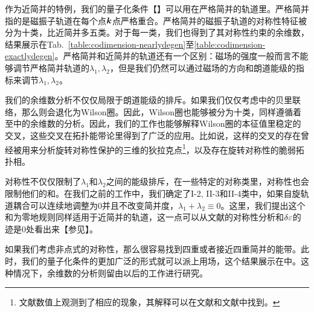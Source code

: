 作为近简并的特例，我们的量子化条件【】可以用在严格简并的轨道里。严格简并指的是磁振子轨道在每个点$\boldsymbol{k}$点严格重合。严格简并的磁振子轨道的对称性特征被分为十类，比近简并多五类。对于每一类，我们也得到了其对称性约束的余维数，结果展示在Tab.\ \ref{table:codimension-nearlydegen}至\ref{table:codimension-exactlydegen}。严格简并和近简并的轨道还有一个区别：磁场的强度一般而言不能够调节严格简并轨道的$\lambda_1,\lambda_2$，但是我们仍然可以通过磁场的方向和朗道能级的指标来调节$\lambda_1,\lambda_2$。


我们的余维数分析不仅仅局限于朗道能级的排斥。如果我们仅仅考虑中的贝里联络，那么则会退化为Wilson圈\cite{wilczek_appearance_1984}。因此，Wilson圈也能够被分为十类，同样遵循着至中的余维数的分析。因此，我们的工作也能够解释Wilson圈的本征值里稳定的交叉，这些交叉在拓扑能带论里得到了广泛的应用。比如说，这样的交叉的存在曾经被用来分析旋转对称性保护的三维的狄拉克点\footnote{文献数值上观测到了相应的现象，其解释可以在文献和文献中找到。}，以及存在旋转对称性的脆弱拓扑相\cite{bouhon_wilson_2018,bradlyn_disconnected_2018}。


对称性不仅仅限制了$\lambda_1$和$\lambda_2$之间的能级排斥，在一些特定的对称类里，对称性也会限制他们的和。在我们之前的工作中\cite{100p,topoferm}，我们确定了I-2, II-3和II-4类中，如果自旋轨道耦合可以连续地调整为0并且不改变简并度，$\lambda_1{+}\lambda_2{\equiv}0$。这里，我们提出这个和为零地规则同样适用于近简并的轨道，这一点可以从文献的对称性分析和$\delta\varepsilon$的迹是0处看出来【参见】。

如果我们考虑非点式的对称性，那么很容易找到四重或者接近四重简并的能带\cite{michel_elementary_2001,wang_hourglass_2016,bradlyn_topological_2017}。此时，我们的量子化条件的更加广泛的形式就可以派上用场，这个结果展示在中。这种情况下，余维数的分析则留由以后的工作进行研究。
